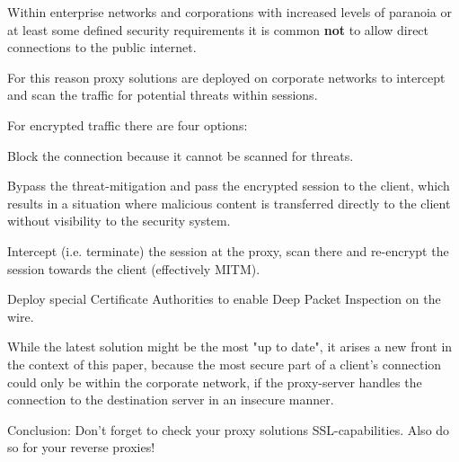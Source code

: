 \gdef\currentsectionname{Proxies}

Within enterprise networks and corporations with increased levels of paranoia or at least some defined security requirements it is common \textbf{not} to allow direct connections to the public internet.

For this reason proxy solutions are deployed on corporate networks to intercept and scan the traffic for potential threats within sessions.

For encrypted traffic there are four options:

\begin{itemize*}
  \item Block the connection because it cannot be scanned for threats.
  \item Bypass the threat-mitigation and pass the encrypted session to the client, which results in a situation where malicious content is transferred directly to the client without visibility to the security system.
  \item Intercept (i.e. terminate) the session at the proxy, scan there and re-encrypt the session towards the client (effectively MITM).
  \item Deploy special Certificate Authorities to enable Deep Packet Inspection on the wire.
\end{itemize*}

While the latest solution might be the most "up to date", it arises a new front in the context of this paper, because the most secure part of a client's connection could only be within the corporate network, if the proxy-server handles the connection to the destination server in an insecure manner.

Conclusion: Don't forget to check your proxy solutions SSL-capabilities. Also do so for your reverse proxies!

